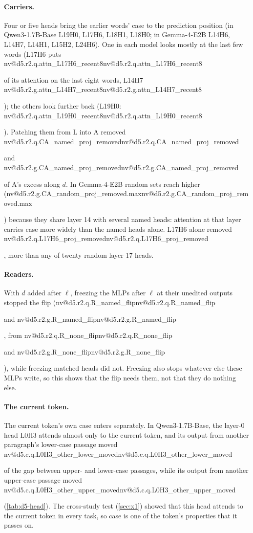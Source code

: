 \documentclass[11pt]{article}
\makeatletter
\newcommand{\nv}[1]{\ifcsname nv@#1\endcsname\csname nv@#1\endcsname\else\PackageError{numbers}{Unknown number key #1}{}\fi}
\newcommand{\hd}[2]{L#1H#2}
\newcommand{\qbig}{Qwen3-1.7B-Base}
\newcommand{\gm}{Gemma-4-E2B}
\newcommand{\DQ}[1]{\nv{d5.c.q.#1}}
\newcommand{\DRQ}[1]{\nv{d5.r2.q.#1}}
\newcommand{\DRG}[1]{\nv{d5.r2.g.#1}}
\makeatother
\begin{document}
\paragraph{Carriers.} Four or five heads bring the earlier words' case to the prediction position (in \qbig{} \hd{19}{0}, \hd{17}{6}, \hd{18}{1}, \hd{18}{0}; in \gm{} \hd{14}{6}, \hd{14}{7}, \hd{14}{1}, \hd{15}{2}, \hd{24}{6}). One in each model looks mostly at the last few words (\hd{17}{6} puts \DRQ{attn_L17H6_recent8} of its attention on the last eight words, \hd{14}{7} \DRG{attn_L14H7_recent8}); the others look further back (\hd{19}{0}: \DRQ{attn_L19H0_recent8}). Patching them from L into A removed \DRQ{CA_named_proj_removed} and \DRG{CA_named_proj_removed} of A's excess along $d$. In \gm{} random sets reach higher (\DRG{CA_random_proj_removed.max}) because they share layer 14 with several named heads: attention at that layer carries case more widely than the named heads alone. \hd{17}{6} alone removed \DRQ{L17H6_proj_removed}, more than any of twenty random layer-17 heads.

\paragraph{Readers.} With $d$ added after $\ell$, freezing the MLPs after $\ell$ at their unedited outputs stopped the flip (\DRQ{R_named_flip} and \DRG{R_named_flip}, from \DRQ{R_none_flip} and \DRG{R_none_flip}), while freezing matched heads did not. Freezing also stops whatever else these MLPs write, so this shows that the flip needs them, not that they do nothing else.

\paragraph{The current token.} The current token's own case enters separately. In \qbig{}, the layer-0 head \hd{0}{3} attends almost only to the current token, and its output from another paragraph's lower-case passage moved \DQ{L0H3_other_lower_moved} of the gap between upper- and lower-case passages, while its output from another upper-case passage moved \DQ{L0H3_other_upper_moved} (\cref{tab:d5-head}). The cross-study test (\cref{sec:x1}) showed that this head attends to the current token in every task, so case is one of the token's properties that it passes on.
\end{document}
